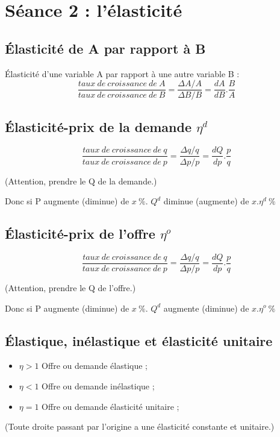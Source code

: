 \section{Séance 2 : l'élasticité}



\subsection{Élasticité de A par rapport à B}
Élasticité d'une variable A par rapport à une autre variable B :
$$\frac{taux\ de\ croissance\ de\ A}{taux\ de\ croissance\ de\ B}=\frac{\Delta A/A}{\Delta B/B}=\frac{dA}{dB}.\frac{B}{A}$$



\subsection{Élasticité-prix de la demande $\eta^d$}
$$\frac{taux\ de\ croissance\ de\ q}{taux\ de\ croissance\ de\ p}=\frac{\Delta q/q}{\Delta p/p}=\frac{dQ}{dp}.\frac{p}{q}$$ 
\begin{flushright}
	(Attention, prendre le Q de la demande.)
\end{flushright}
Donc si P augmente (diminue) de $x\ \%$. $Q^d$ diminue (augmente) de $x.\eta^d\ \%$



\subsection{Élasticité-prix de l'offre $\eta^o$}
$$\frac{taux\ de\ croissance\ de\ q}{taux\ de\ croissance\ de\ p}=\frac{\Delta q/q}{\Delta p/p}=\frac{dQ}{dp}.\frac{p}{q}$$ 
\begin{flushright}
	(Attention, prendre le Q de l'offre.)
\end{flushright}
Donc si P augmente (diminue) de $x\ \%$. $Q^d$ augmente (diminue) de $x.\eta^o\ \%$



\subsection{Élastique, inélastique et élasticité unitaire}
\begin{itemize} 
\item $\eta > 1$ Offre ou demande élastique ;
\item $\eta < 1$ Offre ou demande inélastique ;
\item $\eta = 1$ Offre ou demande élasticité unitaire ;
\end{itemize}
\begin{flushright}
(Toute droite passant par l’origine a une élasticité constante et unitaire.)
\end{flushright}


